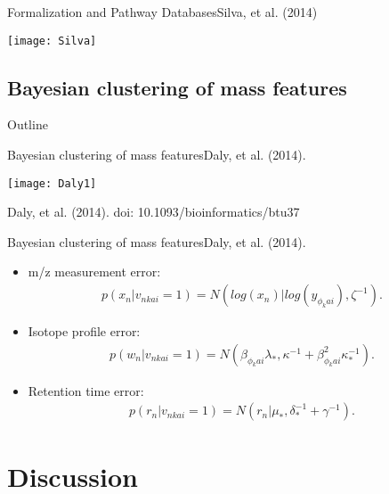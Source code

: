 \documentclass[xcolor=dvipsnames]{beamer}
\begin{document}
\begin{frame}{Formalization and Pathway Databases}{Silva, et al. (2014)}
	\vspace{-12pt}
	\begin{center}
		\texttt{[image: Silva]}
	\end{center}
\end{frame}

\subsection{Bayesian clustering of mass features}
\begin{frame}{Outline}
	\vspace{-10.5pt}
	\tableofcontents[currentsection,subsectionstyle=show/shaded/hide]
\end{frame}

\begin{frame}{Bayesian clustering of mass features}{Daly, et al. (2014).}
	\vspace{-12pt}
	\begin{center}
		\texttt{[image: Daly1]}
		
		Daly, et al. (2014). doi: 10.1093/bioinformatics/btu37
	\end{center}
\end{frame}

\begin{frame}{Bayesian clustering of mass features}{Daly, et al. (2014).}
	\vspace{-12pt}
	\begin{itemize}
		\item m/z measurement error:
			\begin{align*}
			p(x_n|v_{nkai}=1) = N(log(x_n)|log(y_{\phi_k ai}),\zeta^{-1}). 
			\end{align*} \pause
		\item Isotope profile error:
			\begin{align*}
			p(w_n|v_{nkai}=1)=N(\beta_{\phi_k ai} \lambda_{*},\kappa^{-1}+\beta^2_{\phi_k ai}\kappa^{-1}_{*}).
			\end{align*} \pause
		\item Retention time error:
			\begin{align*}
			p(r_n|v_{nkai}=1)=N(r_n|\mu_*,\delta_*^{-1}+\gamma^{-1}).
			\end{align*}
	\end{itemize}
\end{frame}

\section{Discussion}
\end{document}
